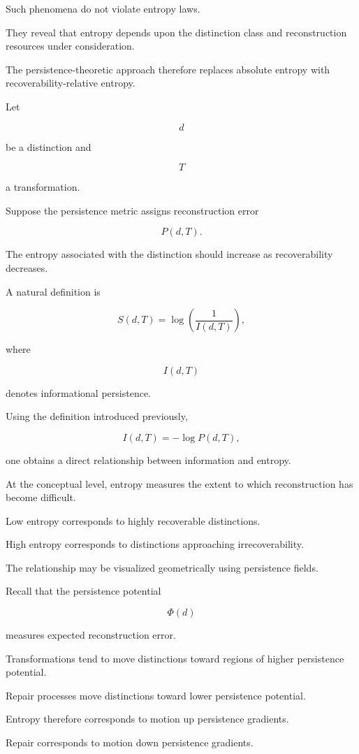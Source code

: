 \documentclass[12pt,oneside]{article}
\theoremstyle{definition}
\begin{document}
Such phenomena do not violate entropy laws.

They reveal that entropy depends upon the distinction class and reconstruction resources under consideration.

The persistence-theoretic approach therefore replaces absolute entropy with recoverability-relative entropy.

Let

\[
d
\]

be a distinction and

\[
T
\]

a transformation.

Suppose the persistence metric assigns reconstruction error

\[
P(d,T).
\]

The entropy associated with the distinction should increase as recoverability decreases.

A natural definition is

\[
S(d,T)
=
\log\!\left(
\frac{1}{I(d,T)}
\right),
\]

where

\[
I(d,T)
\]

denotes informational persistence.

Using the definition introduced previously,

\[
I(d,T)
=
-\log P(d,T),
\]

one obtains a direct relationship between information and entropy.

At the conceptual level, entropy measures the extent to which reconstruction has become difficult.

Low entropy corresponds to highly recoverable distinctions.

High entropy corresponds to distinctions approaching irrecoverability.

The relationship may be visualized geometrically using persistence fields.

Recall that the persistence potential

\[
\Phi(d)
\]

measures expected reconstruction error.

Transformations tend to move distinctions toward regions of higher persistence potential.

Repair processes move distinctions toward lower persistence potential.

Entropy therefore corresponds to motion up persistence gradients.

Repair corresponds to motion down persistence gradients.
\end{document}
